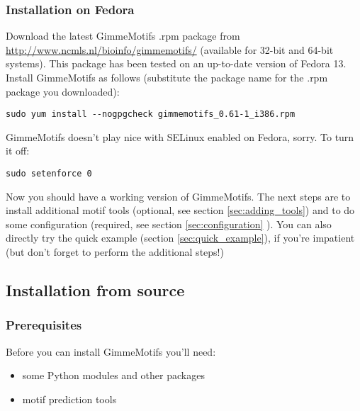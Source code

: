 \documentclass[11pt]{article}
\begin{document}
\subsubsection{Installation on Fedora}
Download the latest GimmeMotifs .rpm package from \url{http://www.ncmls.nl/bioinfo/gimmemotifs/} (available for 32-bit and 64-bit systems). This package has been tested on an up-to-date version of Fedora 13. Install GimmeMotifs as follows (substitute the package name for the .rpm package you downloaded):
\begin{verbatim}
sudo yum install --nogpgcheck gimmemotifs_0.61-1_i386.rpm 
\end{verbatim}
GimmeMotifs doesn't play nice with SELinux enabled on Fedora, sorry. To turn it off:
\begin{verbatim}
sudo setenforce 0
\end{verbatim}
Now you should have a working version of GimmeMotifs. The next steps are to install additional motif tools (optional, see section \ref{sec:adding_tools}) and to do some configuration (required, see section \ref{sec:configuration} ). You can also directly try the quick example (section \ref{sec:quick_example}), if you're impatient (but don't forget to perform the additional steps!)

\subsection{Installation from source}

\subsubsection{Prerequisites}
Before you can install GimmeMotifs you'll need: 
\begin{itemize}
 \item some Python modules and other packages 
 \item motif prediction tools
\end{itemize}
\end{document}
